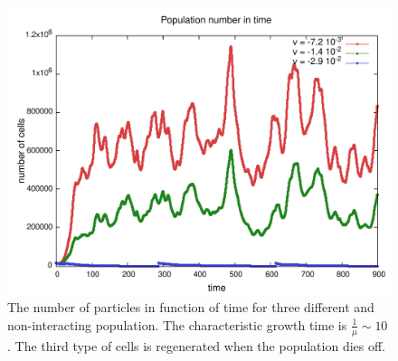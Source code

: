 \begin{figure}[h]
    \includegraphics[width=\textwidth]{data/3D_model/run2/number}
    \caption{The number of particles in function of time for three different and non-interacting population. The characteristic growth time is \(\frac{1}{\mu} \sim 10\). The third type of cells is regenerated when the population dies off.}
    \label{fig:lag_res_number}
\end{figure}